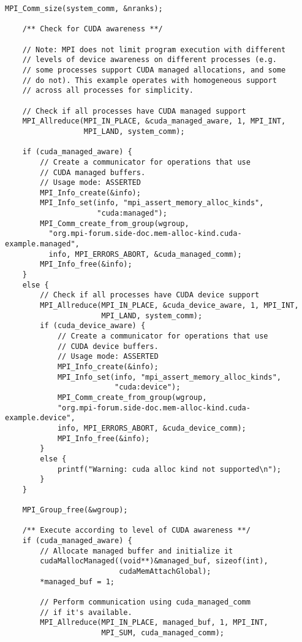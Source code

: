 \begin{example}
\begin{lstlisting}[language={[MPI]C}]
    MPI_Comm_size(system_comm, &nranks);

    /** Check for CUDA awareness **/
    
    // Note: MPI does not limit program execution with different
    // levels of device awareness on different processes (e.g.
    // some processes support CUDA managed allocations, and some
    // do not). This example operates with homogeneous support
    // across all processes for simplicity.

    // Check if all processes have CUDA managed support
    MPI_Allreduce(MPI_IN_PLACE, &cuda_managed_aware, 1, MPI_INT,
                  MPI_LAND, system_comm);

    if (cuda_managed_aware) {
        // Create a communicator for operations that use
        // CUDA managed buffers.
        // Usage mode: ASSERTED
        MPI_Info_create(&info);
        MPI_Info_set(info, "mpi_assert_memory_alloc_kinds",
                     "cuda:managed");
        MPI_Comm_create_from_group(wgroup,
          "org.mpi-forum.side-doc.mem-alloc-kind.cuda-example.managed",
          info, MPI_ERRORS_ABORT, &cuda_managed_comm);
        MPI_Info_free(&info);
    }
    else {
        // Check if all processes have CUDA device support
        MPI_Allreduce(MPI_IN_PLACE, &cuda_device_aware, 1, MPI_INT,
                      MPI_LAND, system_comm);
        if (cuda_device_aware) {
            // Create a communicator for operations that use
            // CUDA device buffers.
            // Usage mode: ASSERTED
            MPI_Info_create(&info);
            MPI_Info_set(info, "mpi_assert_memory_alloc_kinds",
                         "cuda:device");
            MPI_Comm_create_from_group(wgroup,
            "org.mpi-forum.side-doc.mem-alloc-kind.cuda-example.device",
            info, MPI_ERRORS_ABORT, &cuda_device_comm);
            MPI_Info_free(&info);
        }
        else {
            printf("Warning: cuda alloc kind not supported\n");
        }
    }

    MPI_Group_free(&wgroup);

    /** Execute according to level of CUDA awareness **/
    if (cuda_managed_aware) {
        // Allocate managed buffer and initialize it
        cudaMallocManaged((void**)&managed_buf, sizeof(int),
                          cudaMemAttachGlobal);
        *managed_buf = 1;

        // Perform communication using cuda_managed_comm
        // if it's available.
        MPI_Allreduce(MPI_IN_PLACE, managed_buf, 1, MPI_INT,
                      MPI_SUM, cuda_managed_comm);


\end{lstlisting}
\end{example}
